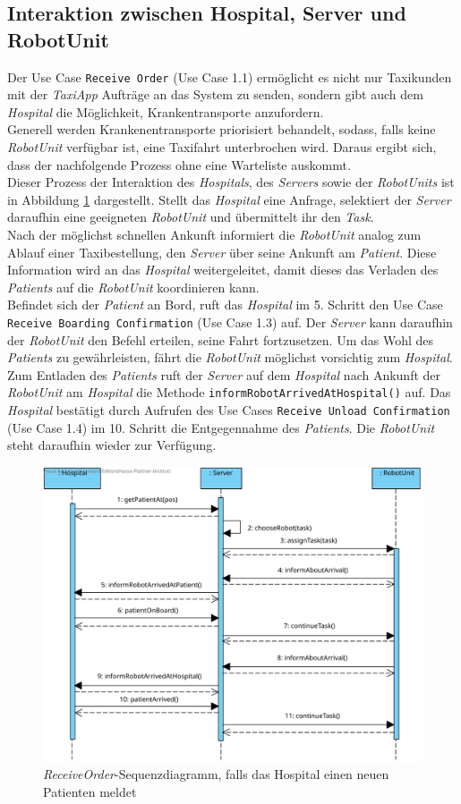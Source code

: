 \subsection*{Interaktion zwischen Hospital, Server und RobotUnit}
Der Use Case \texttt{Receive Order} (Use Case 1.1) ermöglicht es nicht nur Taxikunden mit der \emph{TaxiApp} Aufträge an das System zu senden, sondern gibt auch dem \emph{Hospital} die Möglichkeit, Krankentransporte anzufordern. \\
Generell werden Krankenentransporte priorisiert behandelt, sodass, falls keine \emph{RobotUnit} verfügbar ist, eine Taxifahrt unterbrochen wird. Daraus ergibt sich, dass der nachfolgende Prozess ohne eine Warteliste auskommt. \\
Dieser Prozess der Interaktion des \emph{Hospitals}, des \emph{Servers} sowie der \emph{RobotUnits} ist in Abbildung \ref{SequenzDiagrammInteraktionHospital} dargestellt.
Stellt das \emph{Hospital} eine Anfrage, selektiert der \emph{Server} daraufhin eine geeigneten \emph{RobotUnit} und übermittelt ihr den \emph{Task}. \\
Nach der möglichst schnellen Ankunft informiert die \emph{RobotUnit} analog zum Ablauf einer Taxibestellung, den \emph{Server} über seine Ankunft am \emph{Patient}. Diese Information wird an das \emph{Hospital} weitergeleitet, damit dieses das Verladen des \emph{Patients} auf die \emph{RobotUnit} koordinieren kann. \\
Befindet sich der \emph{Patient} an Bord, ruft das \emph{Hospital} im 5. Schritt den Use Case \texttt{Receive Boarding Confirmation} (Use Case 1.3) auf. Der \emph{Server} kann daraufhin der \emph{RobotUnit} den Befehl erteilen, seine Fahrt fortzusetzen. Um das Wohl des \emph{Patients} zu gewährleisten, fährt die \emph{RobotUnit} möglichst vorsichtig zum \emph{Hospital}. \\
Zum Entladen des \emph{Patients} ruft der \emph{Server} auf dem \emph{Hospital} nach Ankunft der \emph{RobotUnit} am \emph{Hospital} die Methode \texttt{informRobotArrivedAtHospital()} auf. Das \emph{Hospital} bestätigt durch Aufrufen des Use Cases \texttt{Receive Unload Confirmation} (Use Case 1.4) im 10. Schritt die Entgegennahme des \emph{Patients}. Die \emph{RobotUnit} steht daraufhin wieder zur Verfügung.
\begin{figure}[H]
	\centering
	\includegraphics[width=1\textwidth]{img/2-Entwurf-ReceiveOrder-Hosp}
	\caption{\emph{ReceiveOrder}-Sequenzdiagramm, falls das Hospital einen neuen Patienten meldet}
	\label{SequenzDiagrammInteraktionHospital}
\end{figure}


